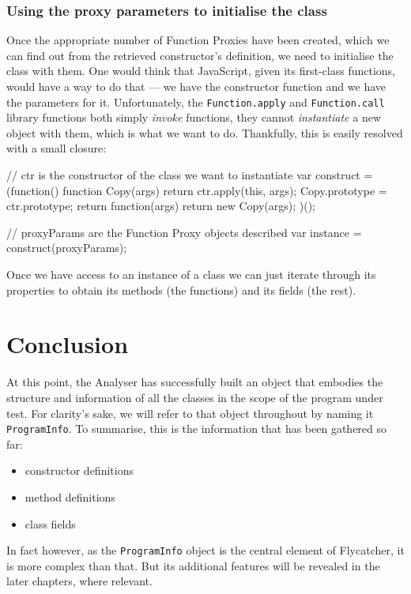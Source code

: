 \subsubsection{Using the proxy parameters to initialise the class}
Once the appropriate number of Function Proxies have been created, which we can find out from the retrieved constructor's definition, we need to initialise the class with them. One would think that JavaScript, given its first-class functions, would have a way to do that --- we have the constructor function and we have the parameters for it. Unfortunately, the \texttt{Function.apply} and \texttt{Function.call} library functions both simply \emph{invoke} functions, they cannot \emph{instantiate} a new object with them, which is what we want to do. Thankfully, this is easily resolved with a small closure:

\begin{verbcode}
// ctr is the constructor of the class we want to instantiate
var construct = (function() {
    function Copy(args) {
        return ctr.apply(this, args);
    }
    Copy.prototype = ctr.prototype;
    return function(args) {
        return new Copy(args);
    }
})();

// proxyParams are the Function Proxy objects described
var instance = construct(proxyParams);
\end{verbcode}

Once we have access to an instance of a class we can just iterate through its properties to obtain its methods (the functions) and its fields (the rest).

\section{Conclusion}
At this point, the Analyser has successfully built an object that embodies the structure and information of all the classes in the scope of the program under test. For clarity's sake, we will refer to that object throughout by naming it \texttt{ProgramInfo}. To summarise, this is the information that has been gathered so far:

\begin{itemize}
   \item constructor definitions \checkmark
   \item method definitions \checkmark
   \item class fields \checkmark
\end{itemize}

In fact however, as the \texttt{ProgramInfo} object is the central element of \textsf{Flycatcher}, it is more complex than that. But its additional features will be revealed in the later chapters, where relevant.